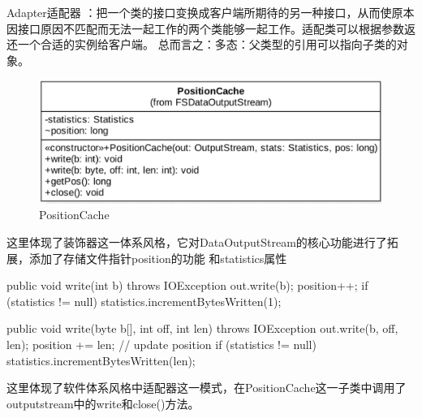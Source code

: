 Adapter适配器 ：把一个类的接口变换成客户端所期待的另一种接口，从而使原本因接口原因不匹配而无法一起工作的两个类能够一起工作。适配类可以根据参数返还一个合适的实例给客户端。
总而言之：多态：父类型的引用可以指向子类的对象。
\begin{figure}
\centering
\includegraphics[width =1\linewidth]{positioncache.png}
\caption{PositionCache}
\label{fig:sa:PositionCache}
\end{figure}
这里体现了装饰器这一体系风格，它对DataOutputStream的核心功能进行了拓展，添加了存储文件指针position的功能
和statistics属性
\begin{java}
public void write(int b) throws IOException {
  out.write(b);
  position++;
  if (statistics != null) {
    statistics.incrementBytesWritten(1);
  }
}

public void write(byte b[], int off, int len) throws IOException {
  out.write(b, off, len);
  position += len;                            // update position
  if (statistics != null) {
    statistics.incrementBytesWritten(len);
  }
}
\end{java}
这里体现了软件体系风格中适配器这一模式，在PositionCache这一子类中调用了outputstream中的write和close()方法。


\endinput

